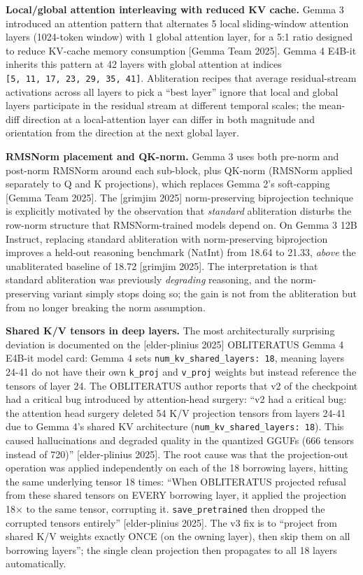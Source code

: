 \documentclass[
  11pt,
]{article}
\begin{document}
\textbf{Local/global attention interleaving with reduced KV cache.}
Gemma 3 introduced an attention pattern that alternates 5 local
sliding-window attention layers (1024-token window) with 1 global
attention layer, for a 5:1 ratio designed to reduce KV-cache memory
consumption {[}Gemma Team 2025{]}. Gemma 4 E4B-it inherits this pattern
at 42 layers with global attention at indices
\texttt{{[}5,\ 11,\ 17,\ 23,\ 29,\ 35,\ 41{]}}. Abliteration recipes
that average residual-stream activations across all layers to pick a
``best layer'' ignore that local and global layers participate in the
residual stream at different temporal scales; the mean-diff direction at
a local-attention layer can differ in both magnitude and orientation
from the direction at the next global layer.

\textbf{RMSNorm placement and QK-norm.} Gemma 3 uses both pre-norm and
post-norm RMSNorm around each sub-block, plus QK-norm (RMSNorm applied
separately to Q and K projections), which replaces Gemma 2's
soft-capping {[}Gemma Team 2025{]}. The {[}grimjim 2025{]}
norm-preserving biprojection technique is explicitly motivated by the
observation that \emph{standard} abliteration disturbs the row-norm
structure that RMSNorm-trained models depend on. On Gemma 3 12B
Instruct, replacing standard abliteration with norm-preserving
biprojection improves a held-out reasoning benchmark (NatInt) from 18.64
to 21.33, \emph{above} the unabliterated baseline of 18.72 {[}grimjim
2025{]}. The interpretation is that standard abliteration was previously
\emph{degrading} reasoning, and the norm-preserving variant simply stops
doing so; the gain is not from the abliteration but from no longer
breaking the norm assumption.

\textbf{Shared K/V tensors in deep layers.} The most architecturally
surprising deviation is documented on the {[}elder-plinius 2025{]}
OBLITERATUS Gemma 4 E4B-it model card: Gemma 4 sets
\texttt{num\_kv\_shared\_layers:\ 18}, meaning layers 24-41 do not have
their own \texttt{k\_proj} and \texttt{v\_proj} weights but instead
reference the tensors of layer 24. The OBLITERATUS author reports that
v2 of the checkpoint had a critical bug introduced by attention-head
surgery: ``v2 had a critical bug: the attention head surgery deleted 54
K/V projection tensors from layers 24-41 due to Gemma 4's shared KV
architecture (\texttt{num\_kv\_shared\_layers:\ 18}). This caused
hallucinations and degraded quality in the quantized GGUFs (666 tensors
instead of 720)'' {[}elder-plinius 2025{]}. The root cause was that the
projection-out operation was applied independently on each of the 18
borrowing layers, hitting the same underlying tensor 18 times: ``When
OBLITERATUS projected refusal from these shared tensors on EVERY
borrowing layer, it applied the projection 18× to the same tensor,
corrupting it. \texttt{save\_pretrained} then dropped the corrupted
tensors entirely'' {[}elder-plinius 2025{]}. The v3 fix is to ``project
from shared K/V weights exactly ONCE (on the owning layer), then skip
them on all borrowing layers''; the single clean projection then
propagates to all 18 layers automatically.
\end{document}
